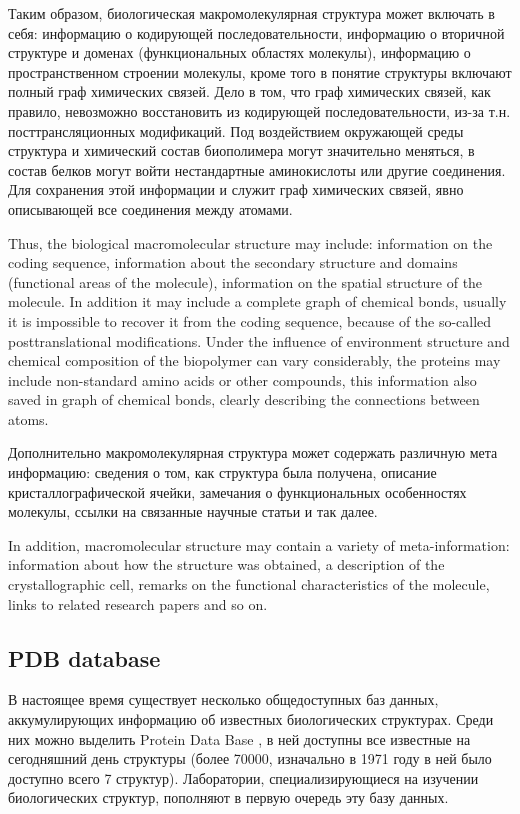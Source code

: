 \documentclass[a4paper, 12pt, titlepage, utf8]{extarticle}
\begin{document}
\begin{original}
Таким образом, биологическая макромолекулярная структура может включать в себя:
информацию о кодирующей последовательности, информацию о вторичной структуре и
доменах (функциональных областях молекулы), информацию о пространственном
строении молекулы, кроме того в понятие структуры включают полный граф
химических связей. Дело в том, что граф химических связей, как правило,
невозможно восстановить из кодирующей последовательности, из-за т.н.
посттрансляционных модификаций. Под воздействием окружающей среды структура и
химический состав биополимера могут значительно меняться, в состав белков могут
войти нестандартные аминокислоты или другие соединения. Для сохранения этой
информации и служит граф химических связей, явно описывающей все соединения
между атомами.
\end{original}

Thus, the biological macromolecular structure may include: information on the
coding sequence, information about the secondary structure and domains
(functional areas of the molecule), information on the spatial structure of the
molecule. In addition it may include a complete graph of chemical bonds, usually
it is impossible to recover it from the coding sequence, because of the
so-called posttranslational modifications. Under the influence of environment
structure and chemical composition of the biopolymer can vary considerably, the
proteins may include non-standard amino acids or other compounds, this
information also saved in graph of chemical bonds, clearly describing the
connections between atoms.

\begin{original}
Дополнительно макромолекулярная структура может содержать различную мета
информацию: сведения о том, как структура была получена, описание
кристаллографической ячейки, замечания о функциональных особенностях молекулы,
ссылки на связанные научные статьи и так далее.
\end{original}

In addition, macromolecular structure may contain a variety of meta-information:
information about how the structure was obtained, a description of the
crystallographic cell, remarks on the functional characteristics of the
molecule, links to related research papers and so on.

\subsection{PDB database}
\begin{original}
В настоящее время существует несколько общедоступных баз данных, аккумулирующих
информацию об известных биологических структурах. Среди них можно выделить
Protein Data Base \cite{pdb}, в ней доступны все известные на сегодняшний день
структуры (более 70000,  изначально в 1971 году в ней было доступно всего 7
структур). Лаборатории, специализирующиеся на изучении биологических структур,
пополняют в первую очередь эту базу данных.
\end{original}
\end{document}
